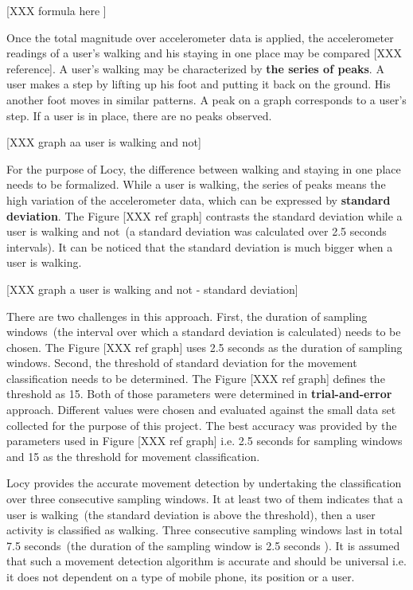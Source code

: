 [XXX formula here ]

Once the total magnitude over accelerometer data is applied, the accelerometer readings of a user's walking and his staying in one place may be compared [XXX reference]. A user's walking may be characterized by \textbf{the series of peaks}. A user makes a step by lifting up his foot and putting it back on the ground. His another foot moves in similar patterns. A peak on a graph corresponds to a user's step. If a user is in place, there are no peaks observed. 

[XXX graph aa user is walking and not]

For the purpose of Locy, the difference between walking and staying in one place needs to be formalized. While a user is walking, the series of peaks means the high variation of the accelerometer data, which can be expressed by \textbf{standard deviation}. The Figure [XXX ref graph] contrasts the standard deviation while a user is walking and not\ (a standard deviation was calculated over 2.5 seconds intervals). It can be noticed that the standard deviation is much bigger when a user is walking.

[XXX graph a user is walking and not  - standard deviation]

There are two challenges in this approach. First, the duration of sampling windows\ (the interval over which a standard deviation is calculated) needs to be chosen. The Figure [XXX ref graph] uses 2.5 seconds as the duration of sampling windows. Second, the threshold of standard deviation for the movement classification needs to be determined.  The Figure [XXX ref graph] defines the threshold as 15. Both of those parameters were determined in \textbf{trial-and-error} approach. Different values were chosen and evaluated against the small data set collected for the purpose of this project. The best accuracy was provided by the parameters used in Figure [XXX ref graph] i.e. 2.5 seconds for sampling windows and 15 as the threshold for movement classification. 

Locy provides the accurate movement detection by undertaking the classification over three consecutive sampling windows. It at least two of them indicates that a user is walking\ (the standard deviation is above the threshold), then a user activity is classified as walking. Three consecutive sampling windows last in total 7.5 seconds\ (the duration of the sampling window is 2.5 seconds ). It is assumed that such a movement detection algorithm is accurate and should be universal i.e. it does not dependent on a type of mobile phone, its position or a user.

